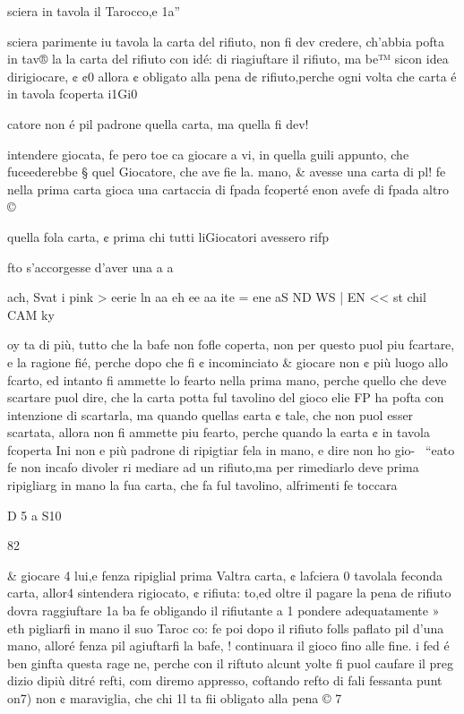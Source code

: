 \documentclass[12pt,a6paper]{article}
\begin{document}
sciera in tavola il Tarocco,e 1a”

sciera parimente iu tavola la
carta del rifiuto, non fi dev
credere, ch’abbia pofta in tav®
la la carta del rifiuto con idé:
di riagiuftare il rifiuto, ma be™
sicon idea dirigiocare, ¢ ¢0%
allora ¢ obligato alla pena d¢
rifiuto,perche ogni volta che
carta é in tavola fcoperta i1Gi0

catore non é pil padrone
quella carta, ma quella fi dev!

intendere giocata, fe pero toe
ca giocare a vi, in quella guili
appunto, che fuceederebbe §
quel Giocatore, che ave fie la.
mano, & avesse una carta di pl!
fe nella prima carta gioca
una cartaccia di fpada fcoperté
enon avefe di fpada altro ©

quella fola carta, ¢ prima chi
tutti liGiocatori avessero rifp

fto s’accorgesse d’aver una a
a

 
 

ach, Svat i pink > eerie ln aa eh ee aa ite = ene aS ND WS | EN << st chil CAM ky

oy
ta di più, tutto che la bafe non
fofle coperta, non per questo
puol piu fcartare, e la ragione
fié, perche dopo che fi ¢ incominciato & giocare non ¢ più
luogo allo fcarto, ed intanto fi
ammette lo fearto nella prima
mano, perche quello che deve
scartare puol dire, che la carta
potta ful tavolino del gioco elie
FP ha pofta con intenzione di
scartarla, ma quando quellas
earta ¢ tale, che non puol esser
scartata, allora non fi ammette
piu fearto, perche quando la
earta ¢ in tavola fcoperta Ini
non e più padrone di ripigtiar
fela in mano, e dire non ho gio-~
“eato fe non incafo divoler ri
mediare ad un rifiuto,ma per rimediarlo deve prima ripigliarg
in mano la fua carta, che fa ful
tavolino, alfrimenti fe toccara

D 5 a S10

 

 

 
 

 

 

 

 

82

& giocare 4 lui,e fenza ripiglial
prima Valtra carta, ¢ lafciera 0
tavolala feconda carta, allor4
sintendera rigiocato, ¢ rifiuta:
to,ed oltre il pagare la pena de
rifiuto dovra raggiuftare 1a ba
fe obligando il rifiutante a 1%
pondere adequatamente » eth
pigliarfi in mano il suo Taroc
co: fe poi dopo il rifiuto folls
paflato pil d’una mano, alloré
fenza pil agiuftarfi la bafe, !
continuara il gioco fino alle
fine. i
fed é ben ginfta questa rage
ne, perche con il riftuto alcunt
yolte fi puol caufare il preg
dizio dipiù ditré refti, com
diremo appresso, coftando
refto di fali fessanta punt on7)
non ¢ maraviglia, che chi 1l
ta fii obligato alla pena © 7
\end{document}
